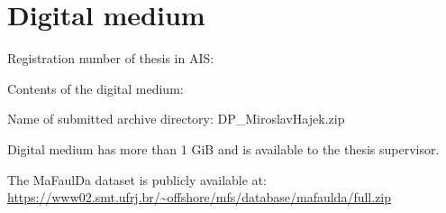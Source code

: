 \thispagestyle{empty}
\setcounter{figure}{0}
\chapter{Digital medium}
\renewcommand*{\thepage}{E-\arabic{page}}
\par Registration number of thesis in AIS: \RegNo
\par Contents of the digital medium:
\par Name of submitted archive directory: DP\_MiroslavHajek.zip
\par Digital medium has more than 1 GiB and is available to the thesis supervisor.
\par The MaFaulDa dataset is publicly available at: \url{https://www02.smt.ufrj.br/~offshore/mfs/database/mafaulda/full.zip}

